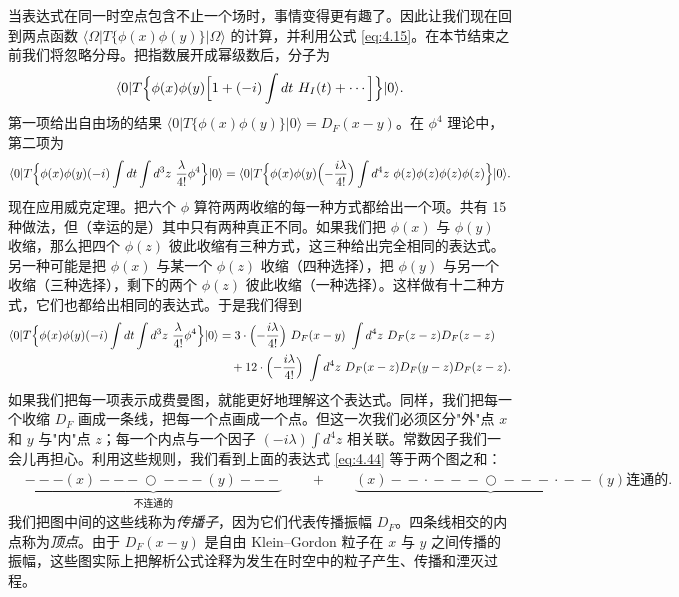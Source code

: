 当表达式在同一时空点包含不止一个场时，事情变得更有趣了。因此让我们现在回到两点函数 $\langle\Omega|T\{\phi(x)\phi(y)\}|\Omega\rangle$ 的计算，并利用公式 \eqref{eq:4.15}。在本节结束之前我们将忽略分母。把指数展开成幂级数后，分子为
\begin{equation}
  \langle 0|T\Bigl\{ \phi(x)\phi(y)
    \Bigl[ 1 + (-i)\int dt\ H_I(t) + \cdots \Bigr] \Bigr\}|0\rangle .
  \label{eq:4.43}
\end{equation}
第一项给出自由场的结果 $\langle 0|T\{\phi(x)\phi(y)\}|0\rangle = D_F(x-y)$。在 $\phi^4$ 理论中，第二项为
\begin{equation}
  \langle 0|T\Bigl\{ \phi(x)\phi(y)(-i)\int dt\int d^3z\
    \frac{\lambda}{4!}\phi^4 \Bigr\}|0\rangle
  = \langle 0|T\Bigl\{ \phi(x)\phi(y)
    \Bigl( -\frac{i\lambda}{4!} \Bigr)\int d^4z\
      \phi(z)\phi(z)\phi(z)\phi(z) \Bigr\}|0\rangle .
\end{equation}
现在应用威克定理。把六个 $\phi$ 算符两两收缩的每一种方式都给出一个项。共有 15 种做法，但（幸运的是）其中只有两种真正不同。如果我们把 $\phi(x)$ 与 $\phi(y)$ 收缩，那么把四个 $\phi(z)$ 彼此收缩有三种方式，这三种给出完全相同的表达式。另一种可能是把 $\phi(x)$ 与某一个 $\phi(z)$ 收缩（四种选择），把 $\phi(y)$ 与另一个收缩（三种选择），剩下的两个 $\phi(z)$ 彼此收缩（一种选择）。这样做有十二种方式，它们也都给出相同的表达式。于是我们得到
\begin{equation}
  \begin{aligned}
    \langle 0|T\Bigl\{ \phi(x)\phi(y)(-i)\int dt\int d^3z\
      \frac{\lambda}{4!}\phi^4 \Bigr\}|0\rangle
    &= 3\cdot\Bigl( -\frac{i\lambda}{4!} \Bigr)\ D_F(x-y)\
      \int d^4z\ D_F(z-z)D_F(z-z)\\
    &\quad + 12\cdot\Bigl( -\frac{i\lambda}{4!} \Bigr)\
      \int d^4z\ D_F(x-z)D_F(y-z)D_F(z-z) .
  \end{aligned}
  \label{eq:4.44}
\end{equation}
如果我们把每一项表示成费曼图，就能更好地理解这个表达式。同样，我们把每一个收缩 $D_F$ 画成一条线，把每一个点画成一个点。但这一次我们必须区分"外"点 $x$ 和 $y$ 与"内"点 $z$；每一个内点与一个因子 $(-i\lambda)\int d^4z$ 相关联。常数因子我们一会儿再担心。利用这些规则，我们看到上面的表达式 \eqref{eq:4.44} 等于两个图之和：
\begin{equation}
  \begin{aligned}
    &\underbrace{---\!(x)---\!\bigcirc\!---(y)---}_{\text{不连通的}}
      \qquad + \qquad
    \underbrace{(x)\!-\!-\!\cdot\!-\!-\!-\!\bigcirc\!-\!-\!-\!\cdot\!-\!-\!(y)}
      {\text{连通的}} .
  \end{aligned}
\end{equation}
我们把图中间的这些线称为\emph{传播子}，因为它们代表传播振幅 $D_F$。四条线相交的内点称为\emph{顶点}。由于 $D_F(x-y)$ 是自由 Klein--Gordon 粒子在 $x$ 与 $y$ 之间传播的振幅，这些图实际上把解析公式诠释为发生在时空中的粒子产生、传播和湮灭过程。

